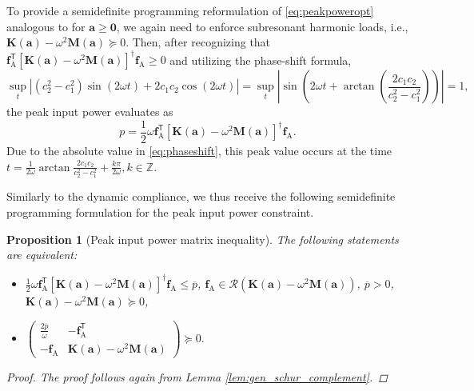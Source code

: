 \documentclass[preprint,3p]{elsarticle}
\newtheorem{proposition}{Proposition}
\newcommand{\T}{^{\mathsf T}}
\newcommand{\A}{\mathrm{A}}
\newcommand{\range}[1]{\ensuremath{\mathcal{R}\!\left(#1\right)}}
\numberwithin{equation}{section}
\begin{document}
To provide a semidefinite programming reformulation of \eqref{eq:peakpoweropt} analogous to \citep{Heidari2009optimization} for $\mathbf{a}\ge \mathbf{0}$, we again need to enforce subresonant harmonic loads, i.e., $\mathbf{K}(\mathbf{a}) - \omega^2 \mathbf{M}(\mathbf{a}) \succeq 0$. Then, after recognizing that $\mathbf{f}_\A\T \left[ \mathbf{K}(\mathbf{a}) - \omega^2 \mathbf{M}(\mathbf{a})\right]^\dagger \mathbf{f}_\A \ge 0$ and utilizing the phase-shift formula,
%
\begin{equation}\label{eq:phaseshift}
 \sup_{t} \left\lvert(c_2^2 - c_1^2) \sin(2\omega t) + 2 c_1 c_2 \cos(2\omega t)\right\rvert = \sup_t \left\lvert\sin\left(2\omega t + \arctan\left(\frac{2 c_1 c_2}{c_2^2 - c_1^2}\right)\right)\right\rvert = 1,
\end{equation}
%
the peak input power evaluates as
%
\begin{equation}\label{eq:peakpowerfinal}
  p = \frac{1}{2} \omega \mathbf{f}_\A\T \left[ \mathbf{K}(\mathbf{a}) - \omega^2 \mathbf{M}(\mathbf{a})\right]^\dagger \mathbf{f}_\A.
\end{equation}
%
Due to the absolute value in \eqref{eq:phaseshift}, this peak value occurs at the time $t = \frac{1}{2\omega} \arctan \frac{2c_1 c_2}{c_2^2 - c_1^2} + \frac{k\pi}{2\omega}, k\in\mathbb{Z}$.

Similarly to the dynamic compliance, we thus receive the following semidefinite programming formulation for the peak input power constraint.

\begin{proposition}[Peak input power matrix inequality]\label{prop:peak_power}
  The following statements are equivalent:
  \begin{itemize}
    \item $\frac{1}{2} \omega \mathbf{f}_\A\T \left[ \mathbf{K}(\mathbf{a}) - \omega^2 \mathbf{M}(\mathbf{a})\right]^\dagger \mathbf{f}_\A \le \overline{p}$, $\mathbf{f}_\A \in \range{\mathbf{K}(\mathbf{a}) - \omega^2 \mathbf{M}(\mathbf{a})}$, $\overline{p}>0$, $\mathbf{K}(\mathbf{a}) - \omega^2 \mathbf{M}(\mathbf{a})\succeq 0$,
    \item %
      $
      \begin{pmatrix}
        \frac{2\overline{p}}{\omega} & - \mathbf{f}_\A\T\\
        -\mathbf{f}_\A & \mathbf{K}(\mathbf{a}) - \omega^2 \mathbf{M}(\mathbf{a})
      \end{pmatrix} \succeq 0.$
  \end{itemize}
  \begin{proof}
    The proof follows again from Lemma \ref{lem:gen_schur_complement}.
  \end{proof}
\end{proposition}
\end{document}
